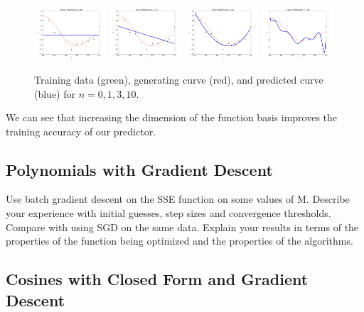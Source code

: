 \documentclass[10pt]{paper}
\begin{document}
\begin{figure}[ht!]
  \centering
  \label{fig:poly}
  \includegraphics[width=0.24\textwidth]{../images/poly0.png}
  \includegraphics[width=0.24\textwidth]{../images/poly1.png}
  \includegraphics[width=0.24\textwidth]{../images/poly3.png}
  \includegraphics[width=0.24\textwidth]{../images/poly10.png}
  \caption{Training data (green), generating curve (red), and predicted curve (blue) for $n = 0, 1, 3, 10$.}
\end{figure}

We can see that increasing the dimension of the function basis improves the training accuracy of our predictor.

\subsection{Polynomials with Gradient Descent}

Use batch gradient descent on the SSE function on some values of M. Describe your experience
with initial guesses, step sizes and convergence thresholds. Compare with using SGD on the
same data. Explain your results in terms of the properties of the function being optimized and
the properties of the algorithms.

\subsection{Cosines with Closed Form and Gradient Descent}
\end{document}

